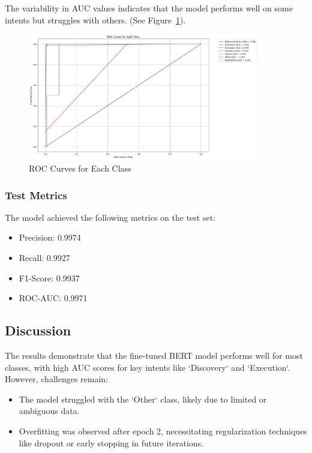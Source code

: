             The variability in AUC values indicates that the model performs well on some intents but struggles with others. (See Figure~\ref{fig:roc}).

            \begin{figure}[h]
                \centering
                \includegraphics[width=0.9\textwidth]{../figures/plots/section4/roc_curves.png}
                \caption{ROC Curves for Each Class}
                \label{fig:roc}
            \end{figure}

        \subsubsection{Test Metrics \\}
        
            The model achieved the following metrics on the test set:
            
            \begin{itemize}
                \item Precision: 0.9974
                \item Recall: 0.9927
                \item F1-Score: 0.9937
                \item ROC-AUC: 0.9971
            \end{itemize}

    \subsection{Discussion}
    
        The results demonstrate that the fine-tuned BERT model performs well for most classes, with high AUC scores for key intents like `Discovery` and `Execution`. However, challenges remain:
        
        \begin{itemize}
        
            \item The model struggled with the `Other` class, likely due to limited or ambiguous data.
            
            \item Overfitting was observed after epoch 2, necessitating regularization techniques like dropout or early stopping in future iterations.
            
        \end{itemize}

